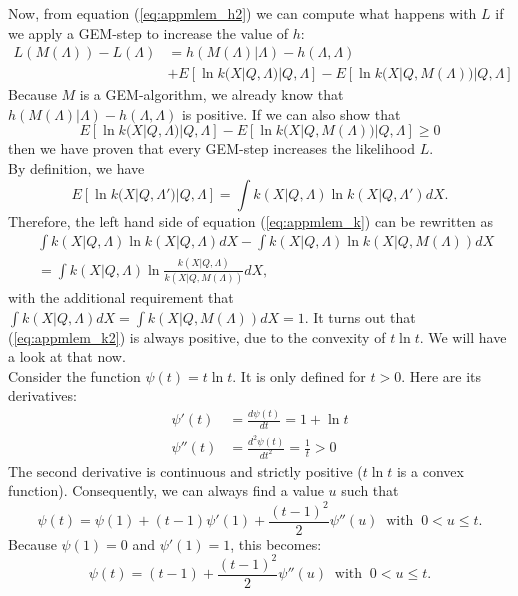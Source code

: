\documentclass[11pt,oneside]{article}
\begin{document}
Now, from equation (\ref{eq:appmlem_h2}) we can compute what happens with $L$
if we apply a GEM-step to increase the value of $h$:
\begin{align}
  L(M(\Lambda)) - L(\Lambda) &=
  h(M(\Lambda) | \Lambda) - h(\Lambda, \Lambda) \nonumber \\
  &  + E\left[\ln k(X | Q, \Lambda) | Q,\Lambda\right] 
       - E\left[\ln k(X | Q, M(\Lambda)) | Q,\Lambda\right] \label{eq:appmlem_l}
\end{align}
Because $M$ is a GEM-algorithm, we already know that $h(M(\Lambda) | \Lambda) -
h(\Lambda, \Lambda)$ is positive. If we can also show that
\begin{equation}
  E\left[\ln k(X | Q, \Lambda) | Q,\Lambda\right] 
   - E\left[\ln k(X | Q, M(\Lambda)) | Q,\Lambda\right] \geq 0 \label{eq:appmlem_k}
\end{equation}
then we have proven that every GEM-step increases the likelihood $L$.\\[3mm]

By definition, we have
\begin{equation}
  E\left[\ln k(X | Q, \Lambda') | Q,\Lambda\right] =
     \int k(X | Q, \Lambda) \ln k(X | Q, \Lambda') dX.
\end{equation}
Therefore, the left hand side of equation (\ref{eq:appmlem_k}) can be
rewritten as
\begin{align}
&  \int k(X | Q, \Lambda) \ln k(X | Q, \Lambda) dX 
  - \int k(X | Q, \Lambda) \ln k(X | Q, M(\Lambda)) dX \\
&= \int k(X | Q, \Lambda)
        \ln \frac{k(X | Q, \Lambda)}{k(X | Q, M(\Lambda))} dX, 
        \label{eq:appmlem_k2}
\end{align}
with the additional requirement that $\int k(X | Q, \Lambda) dX = \int k(X |
Q, M(\Lambda)) dX = 1$. It turns out that (\ref{eq:appmlem_k2}) is always
positive, due to the convexity of $t \ln t$. We will have a look at that
now.\\[3mm]

Consider the function $\psi(t) = t \ln t$. It is only defined for $t >
0$. Here are its derivatives:
\begin{align}
  \psi'(t) &= \frac{d \psi(t)}{dt} = 1 + \ln t\\
  \psi''(t) &= \frac{d^2 \psi(t)}{dt^2} = \frac{1}{t} > 0
\end{align}
The second derivative is continuous and strictly positive ($t \ln t$ is a
convex function). Consequently, we can always find a value $u$ such that
\begin{equation}
  \psi(t) = \psi(1) + (t - 1) \psi'(1) + \frac{(t-1)^2}{2} \psi''(u) 
       \;\; \mbox{with} \;\; 0 < u \leq t.
\end{equation}
Because $\psi(1) = 0$ and $\psi'(1) = 1$, this becomes:
\begin{equation}
  \psi(t) = (t - 1) + \frac{(t-1)^2}{2} \psi''(u) 
       \;\; \mbox{with} \;\; 0 < u \leq t.
\end{equation}
\end{document}
